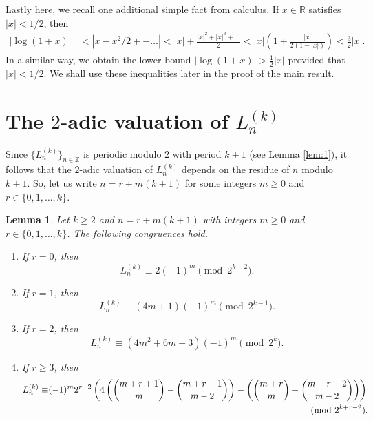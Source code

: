 \documentclass[11pt,a4paper]{article}
\newtheorem{lemma}[theorem]{Lemma}
\numberwithin{equation}{section}
\numberwithin{table}{section}
\numberwithin{figure}{section}
\begin{document}
Lastly here, we recall one additional simple fact from calculus. If $x\in \mathbb{R}$ satisfies $|x|<1/2$, then 
\begin{align}\label{eq2.5g}
	|\log(1+x)|&<|x-x^2/2+-\dots|
	<|x|+\frac{|x|^2+|x|^3+\dots}2
	<|x|\left(1+\frac{|x|}{2(1-|x|)}\right)<\frac 32 |x|.
\end{align}
In a similar way, we obtain the lower bound $|\log(1+x)|>\frac 12 |x|$ provided that $|x|<1/2$. We shall use these inequalities later in the proof of the main result.


\section{The $2$-adic valuation of $L_n^{(k)}$}

Since $\{L_n^{(k)}\}_{n\in {\mathbb Z}}$ is periodic modulo $2$ with period $k+1$ (see Lemma \ref{lem:1}), it follows that the $2$-adic valuation of $L_n^{(k)}$ depends on the residue of $n$ modulo $k+1$. So, let us write 
$n=r+m(k+1)$ for some integers $m\ge 0$ and $r\in \{0,1,\ldots,k\}$. 

\begin{lemma}
\label{lem:2adic}
Let $k\ge 2$ and  $n=r+m(k+1)$ with integers $m\ge 0$ and $r\in \{0,1,\ldots,k\}$. The following congruences hold.
\begin{enumerate}[\upshape(i)]
\item If $r=0$, then 
\begin{equation}
\label{eq:r=0}
L_n^{(k)}\equiv 2(-1)^m \pmod {2^{k-2}}.
\end{equation}
\item If $r=1$, then 
\begin{equation}
\label{eq:r=1}
L_n^{(k)}\equiv (4m+1)(-1)^m\pmod {2^{k-1}}.
\end{equation}
\item If $r=2$, then 
\begin{equation}
\label{eq:r=2}
L_n^{(k)}\equiv (4m^2+6m+3)(-1)^m\pmod {2^{k}}.
\end{equation}
\item If $r\ge 3$, then 
\begin{align}
\label{eq:rge3}
L_n^{(k)}\equiv &(-1)^m 2^{r-2} \left(4\left(\binom{m+r+1}{m}-\binom{m+r-1}{m-2}\right)-\left(\binom{m+r}{m}-\binom{m+r-2}{m-2}\right)\right)\nonumber\\
&\hspace*{10cm}\pmod {2^{k+r-2}}.
\end{align}
\end{enumerate}
\end{lemma}
\end{document}
